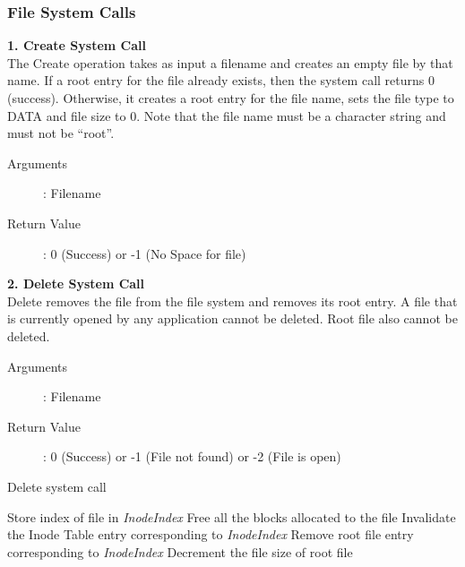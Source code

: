 \documentclass[11pt ,twosided]{article}
\begin{document}
\subsubsection{File System Calls}
\textbf{1. Create System Call}
\vspace{3mm}\\
The Create operation takes as input a filename and creates an empty file by that name. If a root entry for the file already exists, then the system call returns 0 (success). Otherwise, it creates a root entry for the file name, sets the file type to DATA and file size to 0. Note that the file name must be a character string and must not be “root”. 
\begin{description}
\item[Arguments]: Filename
\item[Return Value]: 0 (Success) or -1 (No Space for file)
\end{description}

\textbf{2. Delete System Call}
\vspace{3mm}\\
Delete removes the file from the file system and removes its root entry. A file that is currently opened by any application cannot be deleted. Root file also cannot be deleted.
\begin{description}
	\item[Arguments]: Filename
	\item[Return Value]: 0 (Success) or -1 (File not found) or -2 (File is open)
\end{description} 
\iffalse
\begin{algorithm}
\caption{Delete system call}
\begin{algorithmic}
\ELSE
    \STATE Store index of file in \textit{InodeIndex}
\ENDIF    
{}
\ENDIF
\STATE Free all the blocks allocated to the file
\STATE Invalidate the Inode Table entry corresponding to \textit{InodeIndex}
\STATE Remove root file entry corresponding to \textit{InodeIndex}
\STATE Decrement the file size of root file
\end{algorithmic}
\end{algorithm}
\end{document}
